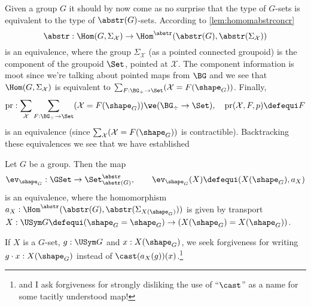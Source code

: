 Given a group $G$ it should by now come as no surprise that the type of $G$-sets is equivalent to the type of $\abstr(G)$-sets.
According to \cref{lem:homomabstrconcr}
$$\abstr:\Hom(G,\Sigma_{\mathcal X})\to\Hom^\abstr(\abstr(G),\abstr(\Sigma_{\mathcal X}))$$
is an equivalence, where the group $\Sigma_{\mathcal X}$ (as a pointed connected groupoid) is the component of the groupoid $\Set$, pointed at $\mathcal X$.  The component information is moot since we're talking about pointed maps from $\BG$ and we see that $\Hom(G,\Sigma_{\mathcal X})$ is equivalent to $\sum_{F:\BG_\div\to\Set}(\mathcal X=F(\shape_G))$.  Finally,
$$\mathrm{pr}:\sum_{\mathcal X}\sum_{F:\BG_\div\to\Set}(\mathcal X=F(\shape_G))\we
(\BG_\div\to\Set),\quad \mathrm{pr}(\mathcal X,F,p)\defequi F
$$
is an equivalence (since $\sum_{\mathcal X}(\mathcal X=F(\shape_G))$ is contractible).
Backtracking these equivalences we see that we have established
\begin{lemma}
  \label{lem:actionsconcreteandabstract}
  Let $G$ be a group.  Then the map
  $$\ev_{\shape_G}:\GSet\to\Set^\abstr_{\abstr(G)},\qquad \ev_{\shape_G}(X)\defequi(X(\shape_G),a_X)
$$
is an equivalence, where the homomorphism $a_X:\Hom^\abstr(\abstr(G), \abstr(\Sigma_{X(\shape_G)}))$ is given by transport $X:\USym G\defequi(\shape_G=\shape_G)\to (X(\shape_G)=X(\shape_G))$.
\end{lemma}
If $X$ is a $G$-set, $g:\USym G$ and $x:X(\shape_G)$, we seek forgiveness for writing $g\cdot x:X(\shape_G)$ instead of $\cast(a_X(g))(x)$.\footnote{and I ask forgiveness for strongly disliking the use of ``$\cast$'' as a name for some tacitly understood map!}

